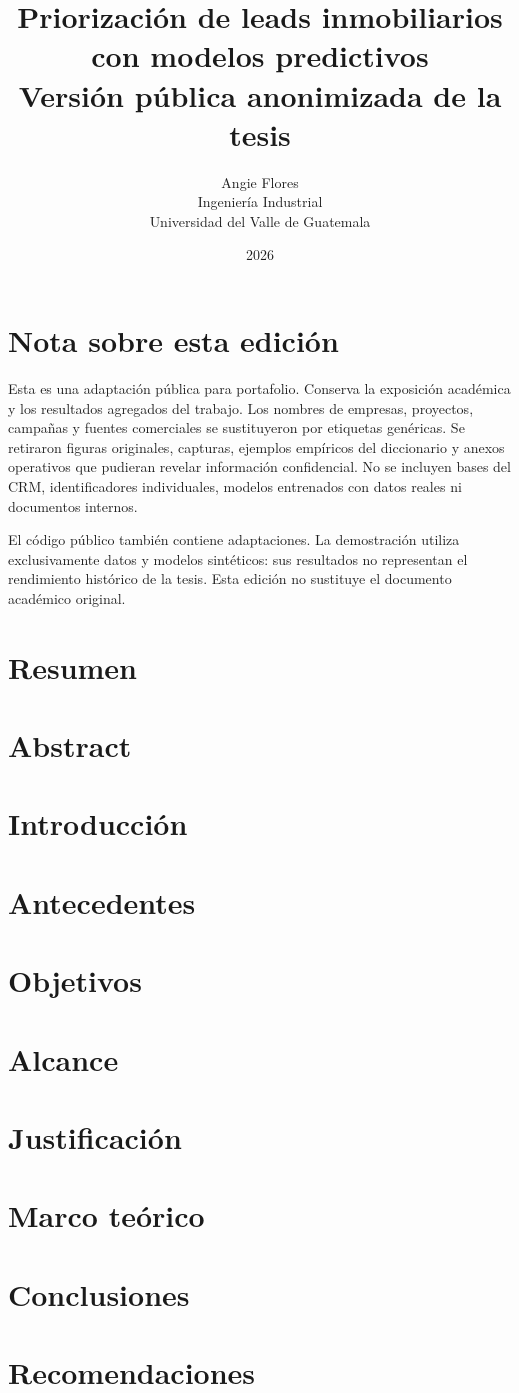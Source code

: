 \documentclass[10pt,letterpaper]{report}
\title{Priorización de leads inmobiliarios con modelos predictivos\\[0.5cm]\large Versión pública anonimizada de la tesis}
\author{Angie Flores\\Ingeniería Industrial\\Universidad del Valle de Guatemala}
\date{2026}
\begin{document}
\maketitle
\chapter*{Nota sobre esta edición}
Esta es una adaptación pública para portafolio. Conserva la exposición académica y los resultados agregados del trabajo. Los nombres de empresas, proyectos, campañas y fuentes comerciales se sustituyeron por etiquetas genéricas. Se retiraron figuras originales, capturas, ejemplos empíricos del diccionario y anexos operativos que pudieran revelar información confidencial. No se incluyen bases del CRM, identificadores individuales, modelos entrenados con datos reales ni documentos internos.

El código público también contiene adaptaciones. La demostración utiliza exclusivamente datos y modelos sintéticos: sus resultados no representan el rendimiento histórico de la tesis. Esta edición no sustituye el documento académico original.
\tableofcontents
\chapter*{Resumen}
\chapter*{Abstract}
\chapter{Introducción}
\chapter{Antecedentes}
\chapter{Objetivos}
\chapter{Alcance}
\chapter{Justificación}
\chapter{Marco teórico}

\chapter{Conclusiones}
\chapter{Recomendaciones}

\appendix
\end{document}

